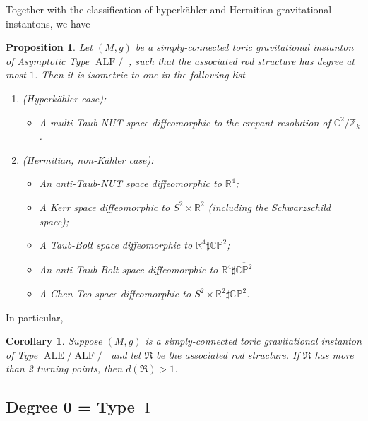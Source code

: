 \documentclass[a4paper,11pt]{amsart}
\newtheorem{corollary}[theorem]{Corollary}
\newtheorem{proposition}[theorem]{Proposition}
\theoremstyle{definition}
\numberwithin{equation}{section}
\newcommand{\C}{\mathbb{C}}
\newcommand{\R}{\mathbb{R}}
\newcommand{\mR} {\mathfrak R}
\DeclareMathOperator{\I}{I}
\DeclareMathOperator{\ALF}{ALF}
\DeclareMathOperator{\ALE}{ALE}
\DeclareMathOperator{\AFa}{AF_\beta}
\begin{document}
Together with the classification of hyperk\"ahler and Hermitian gravitational instantons, we have 
\begin{proposition}
    \label{c:classification of toric GI}
    Let $(M, g)$ be a simply-connected toric gravitational instanton of Asymptotic Type $\ALF/\AFa$, such that the associated rod structure has degree at most $1$.  Then it is isometric to one in the following list
    \begin{enumerate}
    \item (Hyperk\"ahler case):
   \begin{itemize}

       \item A multi-Taub-NUT space diffeomorphic to  the crepant resolution of $\C^2/\mathbb Z_k$.
   \end{itemize}
    \item (Hermitian, non-K\"ahler case):
    \begin{itemize}
             \item An anti-Taub-NUT space diffeomorphic to $\R^4$;
        \item A Kerr space diffeomorphic to $S^2\times \R^2$ (including the Schwarzschild space);
   
        \item A Taub-Bolt space diffeomorphic to $\mathbb R^4\sharp \C\mathbb P^2$;
   \item An anti-Taub-Bolt space diffeomorphic to $\mathbb R^4\sharp \overline{\C\mathbb P^2}$
        \item A Chen-Teo space diffeomorphic to $S^2\times \R^2\sharp \C\mathbb P^2$.
    \end{itemize}
    \end{enumerate}
\end{proposition} 

 In particular, 
\begin{corollary}
    Suppose $(M, g)$ is a simply-connected toric gravitational instanton of Type $\ALE/\ALF/\AFa$ and let $\mR$ be the associated rod structure. If $\mR$ has more than 2 turning points, then $d(\mR)>1$.
\end{corollary}










\subsection{Degree 0 = Type \texorpdfstring{$\I$}{I}}
\end{document}

